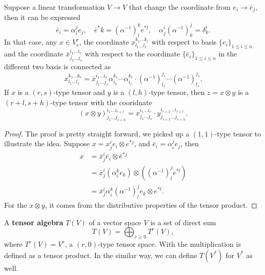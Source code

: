 \begin{theorem}
Suppose a linear transformation $V\to V$ that change the coordinate from $e_i\to \bar e_j$, then it can be expressed
\begin{equation}
\bar e_i=\alpha_i^je_j,\quad \bar e^*{k}=(\alpha^{-1})^k_le^{*l},\quad \alpha^i_j(\alpha^{-1})^j_k=\delta^i_k.
\end{equation}
In that case, any $x\in V^r_s$, the coordinate $x^{k_1\dots k_r}_{l_1\dots l_s}$ with respect to basis $\{e_i\}_{1\le i\le n}$ and the coordinate $\bar x^{i_1\dots i_r}_{j_1\dots j_s}$ with respect to the coordinate $\{\bar e_i\}_{1\le i\le n}$ in the different two basis is connected as
\begin{equation}
x^{k_1\dots k_r}_{l_1\dots l_s}=\bar x^{i_1\dots i_r}_{j_1\dots j_s} \alpha_{i_1}^{k_1}\cdots\alpha_{i_r}^{k_r}\cdot (\alpha^{-1})_{l_1}^{j_1}\cdots(\alpha^{-1})_{l_s}^{j_s}.
\end{equation}
If $x$ is a $(r,s)$-type tensor and $y$ is a $(l,h)$-type tensor, then $z=x\otimes y$ is a $(r+l,s+h)$-type tensor with the cooridnate
\begin{equation}
(x\otimes y)^{i_1\dots i_{r+l}}_{j_1\dots j_{s+h}}=x^{i_1\dots i_r}_{j_1\dots j_s}\cdot y^{i_{r+1}\dots i_{r+l}}_{j_{s+1}\dots j_{s+h}}.
\end{equation}
\end{theorem}

\begin{proof}
The proof is pretty straight forward, we picked up a $(1,1)$-type tensor to illustrate the idea. Suppose $x=x^i_je_i\otimes e^{*j}$, and $\bar e_i=\alpha_i^j e_j$, then
\begin{equation*}
\begin{aligned}
x&=\bar x^i_j\bar e_i\otimes \bar e^{*j}\\
&=\bar x^i_j (\alpha^k_i e_k)\otimes\left((\alpha^{-1})^j_le^{*l}\right)\\
&=\bar x^i_j \alpha^k_i (\alpha^{-1})^j_le_k\otimes e^{*l}.
\end{aligned}
\end{equation*}
For the $x\otimes y$, it comes from the distributive properties of the tensor product.
\end{proof}


\begin{definition}
A \textbf{tensor algebra} $T(V)$ of a vector space $V$ is a set of direct sum
\begin{equation}
T(V)=\bigoplus_{r\ge 0}T^r(V),
\end{equation}
where $T^r(V)=V^r$, a $(r,0)$-type tensor space. With the multiplication is defined as a tensor product. In the similar way, we can define $T(V^*)$ for $V^*$ as well.
\end{definition}

